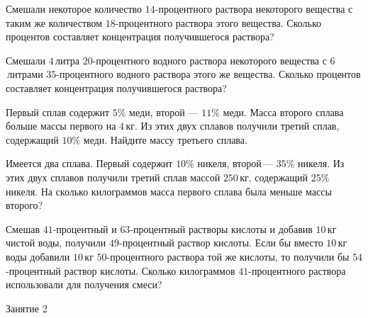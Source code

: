 %

\begin{class}[number=1]
	\begin{listofex}
		\item 
	\end{listofex}
\end{class}

\begin{homework}[number=1]
	\begin{listofex}
		\item Смешали некоторое количество \( 14 \)-процентного раствора некоторого вещества с таким же количеством \( 18 \)-процентного раствора этого вещества. Сколько процентов составляет концентрация получившегося раствора?
		\item Смешали \( 4 \) литра \( 20 \)-процентного водного раствора некоторого вещества с \( 6 \) литрами \( 35 \)-процентного водного раствора этого же вещества. Сколько процентов составляет концентрация получившегося раствора?
		\item Первый сплав содержит \( 5\% \) меди, второй --- \( 11\% \) меди. Масса второго сплава больше массы первого на \( 4 \) кг. Из этих двух сплавов получили третий сплав, содержащий \( 10\% \) меди. Найдите массу третьего сплава.
		\item Имеется два сплава. Первый содержит \( 10\% \) никеля, второй --- \( 35\% \) никеля. Из этих двух сплавов получили третий сплав массой \( 250 \) кг, содержащий \( 25\% \) никеля. На сколько килограммов масса первого сплава была меньше массы второго?
		\item Смешав \( 41 \)-процентный и \( 63 \)-процентный растворы кислоты и добавив \( 10 \) кг чистой воды, получили \( 49 \)-процентный раствор кислоты. Если бы вместо \( 10 \) кг воды добавили \( 10 \) кг \( 50 \)-процентного раствора той же кислоты, то получили бы \( 54 \)-процентный раствор кислоты. Сколько килограммов \( 41 \)-процентного раствора использовали для получения смеси?
	\end{listofex}
\end{homework}

\begin{class}[number=2]
	\begin{listofex}
		\item Занятие 2
	\end{listofex}
\end{class}

